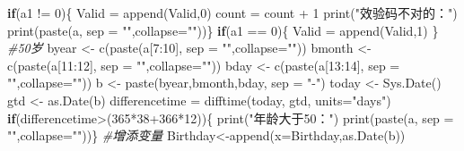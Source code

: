 \documentclass[
]{article}
\newenvironment{Shaded}{\begin{snugshade}}{\end{snugshade}}
\newcommand{\AttributeTok}[1]{\textcolor[rgb]{0.77,0.63,0.00}{#1}}
\newcommand{\CommentTok}[1]{\textcolor[rgb]{0.56,0.35,0.01}{\textit{#1}}}
\newcommand{\ControlFlowTok}[1]{\textcolor[rgb]{0.13,0.29,0.53}{\textbf{#1}}}
\newcommand{\DecValTok}[1]{\textcolor[rgb]{0.00,0.00,0.81}{#1}}
\newcommand{\FunctionTok}[1]{\textcolor[rgb]{0.00,0.00,0.00}{#1}}
\newcommand{\NormalTok}[1]{#1}
\newcommand{\OtherTok}[1]{\textcolor[rgb]{0.56,0.35,0.01}{#1}}
\newcommand{\SpecialCharTok}[1]{\textcolor[rgb]{0.00,0.00,0.00}{#1}}
\newcommand{\StringTok}[1]{\textcolor[rgb]{0.31,0.60,0.02}{#1}}
\begin{document}
\begin{Shaded}
\begin{Highlighting}[]
  \ControlFlowTok{if}\NormalTok{(a1 }\SpecialCharTok{!=} \DecValTok{0}\NormalTok{)\{}
\NormalTok{    Valid }\OtherTok{=} \FunctionTok{append}\NormalTok{(Valid,}\DecValTok{0}\NormalTok{)}
\NormalTok{    count }\OtherTok{=}\NormalTok{ count }\SpecialCharTok{+} \DecValTok{1}
  \FunctionTok{print}\NormalTok{(}\StringTok{"效验码不对的："}\NormalTok{)}
  \FunctionTok{print}\NormalTok{(}\FunctionTok{paste}\NormalTok{(a, }\AttributeTok{sep =} \StringTok{""}\NormalTok{,}\AttributeTok{collapse=}\StringTok{""}\NormalTok{))\}}
  \ControlFlowTok{if}\NormalTok{(a1 }\SpecialCharTok{==} \DecValTok{0}\NormalTok{)\{}
\NormalTok{      Valid }\OtherTok{=} \FunctionTok{append}\NormalTok{(Valid,}\DecValTok{1}\NormalTok{)}
\NormalTok{  \}}
\CommentTok{\#50岁  }
\NormalTok{  byear }\OtherTok{\textless{}{-}} \FunctionTok{c}\NormalTok{(}\FunctionTok{paste}\NormalTok{(a[}\DecValTok{7}\SpecialCharTok{:}\DecValTok{10}\NormalTok{], }\AttributeTok{sep =} \StringTok{""}\NormalTok{,}\AttributeTok{collapse=}\StringTok{""}\NormalTok{))}
\NormalTok{  bmonth }\OtherTok{\textless{}{-}} \FunctionTok{c}\NormalTok{(}\FunctionTok{paste}\NormalTok{(a[}\DecValTok{11}\SpecialCharTok{:}\DecValTok{12}\NormalTok{], }\AttributeTok{sep =} \StringTok{""}\NormalTok{,}\AttributeTok{collapse=}\StringTok{""}\NormalTok{))}
\NormalTok{  bday }\OtherTok{\textless{}{-}} \FunctionTok{c}\NormalTok{(}\FunctionTok{paste}\NormalTok{(a[}\DecValTok{13}\SpecialCharTok{:}\DecValTok{14}\NormalTok{], }\AttributeTok{sep =} \StringTok{""}\NormalTok{,}\AttributeTok{collapse=}\StringTok{""}\NormalTok{))}
\NormalTok{  b }\OtherTok{\textless{}{-}} \FunctionTok{paste}\NormalTok{(byear,bmonth,bday, }\AttributeTok{sep =} \StringTok{"{-}"}\NormalTok{)}
\NormalTok{  today }\OtherTok{\textless{}{-}} \FunctionTok{Sys.Date}\NormalTok{()}
\NormalTok{  gtd }\OtherTok{\textless{}{-}} \FunctionTok{as.Date}\NormalTok{(b) }
\NormalTok{  differencetime }\OtherTok{=} \FunctionTok{difftime}\NormalTok{(today, gtd, }\AttributeTok{units=}\StringTok{"days"}\NormalTok{)}
  \ControlFlowTok{if}\NormalTok{(differencetime}\SpecialCharTok{\textgreater{}}\NormalTok{(}\DecValTok{365}\SpecialCharTok{*}\DecValTok{38}\SpecialCharTok{+}\DecValTok{366}\SpecialCharTok{*}\DecValTok{12}\NormalTok{))\{}
    \FunctionTok{print}\NormalTok{(}\StringTok{"年龄大于50："}\NormalTok{)}
    \FunctionTok{print}\NormalTok{(}\FunctionTok{paste}\NormalTok{(a, }\AttributeTok{sep =} \StringTok{""}\NormalTok{,}\AttributeTok{collapse=}\StringTok{""}\NormalTok{))\}}
\CommentTok{\#增添变量}
\NormalTok{  Birthday}\OtherTok{\textless{}{-}}\FunctionTok{append}\NormalTok{(}\AttributeTok{x=}\NormalTok{Birthday,}\FunctionTok{as.Date}\NormalTok{(b))}

\end{Highlighting}
\end{Shaded}
\end{document}
